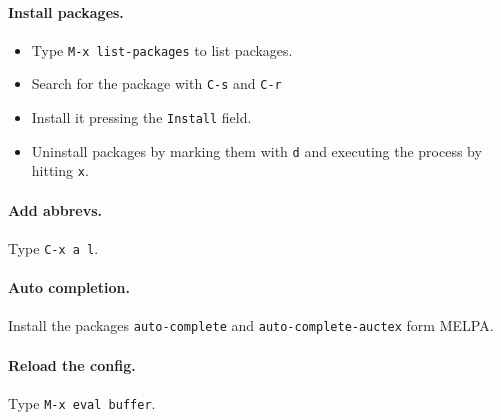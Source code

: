 \documentclass{article}
\begin{document}
\paragraph{Install packages.}
\begin{itemize}
        \item Type \texttt{M-x list-packages} to list packages.
        \item Search for the package with \texttt{C-s} and \texttt{C-r}
        \item Install it pressing the \texttt{Install} field.
        \item Uninstall packages by marking them with \texttt{d} and executing the process by hitting \texttt{x}.
\end{itemize}

\paragraph{Add abbrevs.} Type \texttt{C-x a l}.

\paragraph{Auto completion.} Install the packages \texttt{auto-complete} and \texttt{auto-complete-auctex} form MELPA.

\paragraph{Reload the config.} Type \texttt{M-x eval buffer}.
\end{document}
